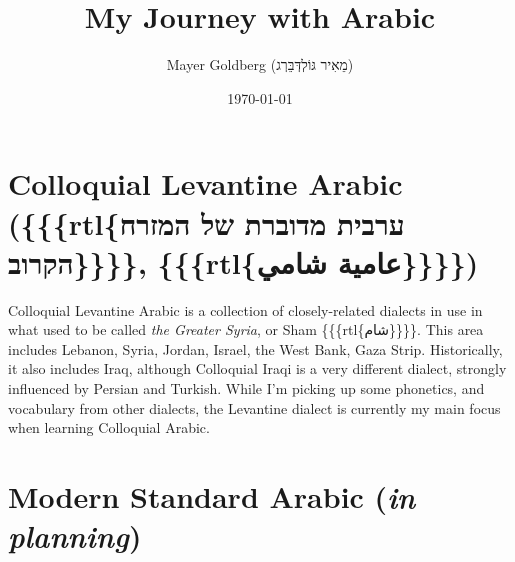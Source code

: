 \documentclass[11pt]{article}
\author{Mayer Goldberg (מֵאִיר גּוֹלְדְּבֵּרְג)}
\date{\today}
\title{My Journey with Arabic}
\begin{document}
\maketitle
\setcounter{tocdepth}{1}
\tableofcontents


\section{Colloquial Levantine Arabic (\{\{\{rtl\{ערבית מדוברת של המזרח הקרוב\}\}\}\}, \{\{\{rtl\{عامية شامي\}\}\}\})}
\label{sec:org5c22ea5}

Colloquial Levantine Arabic is a collection of closely-related dialects in use in what used to be called \emph{the Greater Syria}, or Sham \{\{\{rtl\{شام\}\}\}\}. This area includes Lebanon, Syria, Jordan, Israel, the West Bank, Gaza Strip. Historically, it also includes Iraq, although Colloquial Iraqi is a very different dialect, strongly influenced by Persian and Turkish. While I'm picking up some phonetics, and vocabulary from other dialects, the Levantine dialect is currently my main focus when learning Colloquial Arabic.

\section{Modern Standard Arabic (\emph{in planning})}
\label{sec:org4225ffd}
\end{document}
